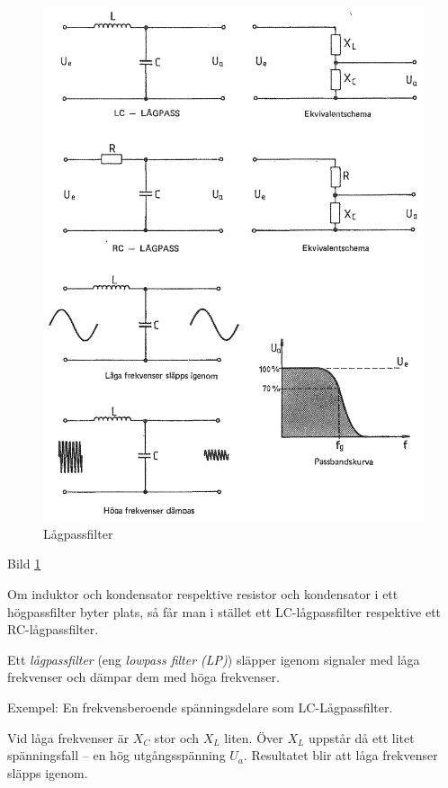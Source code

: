 \begin{figure}
\includegraphics[width=\textwidth]{images/cropped_pdfs/bild_2_3-23.pdf}
\caption{Lågpassfilter}
\label{fig:BildII3-23}
\end{figure}

Bild \ref{fig:BildII3-23}

Om induktor och kondensator respektive resistor och kondensator i ett
högpassfilter byter plats, så får man i stället ett LC-lågpassfilter respektive
ett RC-lågpassfilter.

Ett \emph{lågpassfilter} (eng \emph{lowpass filter (LP)}) släpper igenom
signaler med låga frekvenser och dämpar dem med höga frekvenser.

Exempel: En frekvensberoende spänningsdelare som LC-Lågpassfilter.

Vid låga frekvenser är \(X_C\) stor och \(X_L\) liten. Över \(X_L\) uppstår då
ett litet spänningsfall -- en hög utgångsspänning \(U_a\). Resultatet blir att
låga frekvenser släpps igenom.


